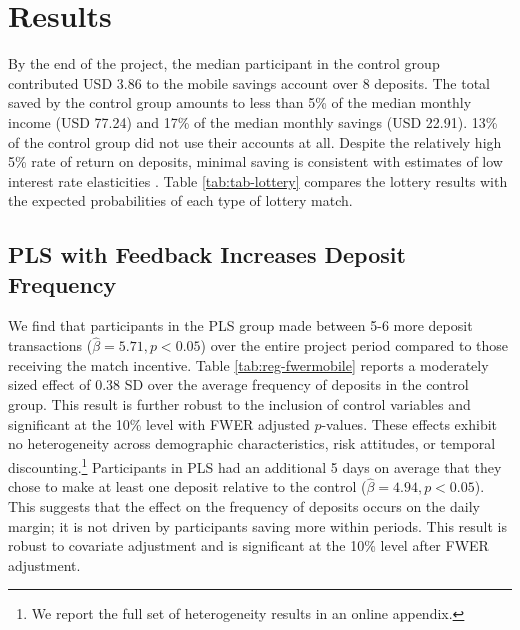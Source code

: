 \documentclass[11pt]{article}
\begin{document}
\section{Results} \label{sec:results}

	By the end of the project, the median participant in the control group contributed USD 3.86 to the mobile savings account over 8 deposits. The total saved by the control group amounts to less than 5\% of the median monthly income (USD 77.24) and 17\% of the median monthly savings (USD 22.91). 13\% of the control group did not use their accounts at all. Despite the relatively high 5\% rate of return on deposits, minimal saving is consistent with estimates of low interest rate elasticities \parencite{karlan_price_2018}. Table \ref{tab:tab-lottery} compares the lottery results with the expected probabilities of each type of lottery match.

	

	\subsection{PLS with Feedback Increases Deposit Frequency}

		We find that participants in the PLS group made between 5-6 more deposit transactions ($\hat \beta = 5.71, p < 0.05$) over the entire project period compared to those receiving the match incentive. Table \ref{tab:reg-fwermobile} reports a moderately sized effect of 0.38 SD over the average frequency of deposits in the control group. This result is further robust to the inclusion of control variables and significant at the 10\% level with FWER adjusted $p$-values. These effects exhibit no heterogeneity across demographic characteristics, risk attitudes, or temporal discounting.\footnote{We report the full set of heterogeneity results in an online appendix.} Participants in PLS had an additional 5 days on average that they chose to make at least one deposit relative to the control ($\hat \beta = 4.94, p < 0.05$). This suggests that the effect on the frequency of deposits occurs on the daily margin; it is not driven by participants saving more within periods. This result is robust to covariate adjustment and is significant at the 10\% level after FWER adjustment.
\end{document}
